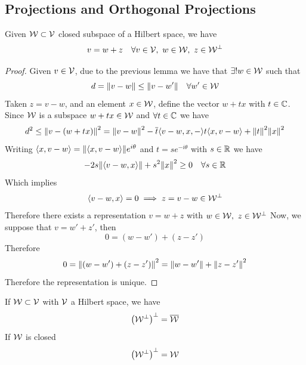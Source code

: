 \documentclass[../complete.tex]{subfiles}
\begin{document}
\subsection{Projections and Orthogonal Projections}
\begin{thm}[Projection]
	Given $\mathcal{W}\subset\mathcal{V}$ closed subspace of a Hilbert space, we have
	\begin{equation*}
		v=w+z\quad\forall v\in\V,\ w\in\W,\ z\in\W^\perp
	\end{equation*}
\end{thm}
\begin{proof}
	Given $v\in\mathcal{V}$, due to the previous lemma we have that $\exists!w\in\mathcal{W}$ such that
	\begin{equation*}
		d=\norm{v-w}\le\norm{v-w'}\quad\forall w'\in\mathcal{W}
	\end{equation*}
	Taken $z=v-w$, and an element $x\in\mathcal{W}$, define the vector $w+tx$ with $t\in\mathbb{C}$. Since $\mathcal{W}$ is a subspace $w+tx\in\mathcal{W}$ and $\forall t\in\mathbb{C}$ we have
	\begin{equation*}
		d^2\le\norm{v-(w+tx)}^2=\norm{v-w}^2-\overline{t}\langle v-w,x, - \rangle t\langle x, v-w \rangle+\norm{t}^2\norm{x}^2
	\end{equation*}
	Writing $\langle x, v-w \rangle=\norm{\langle x, v-w \rangle}e^{i\theta}$ and $t=se^{-i\theta}$ with $s\in\mathbb{R}$ we have
	\begin{equation*}
		-2s\norm{\langle v-w, x \rangle}+s^2\norm{x}^2\ge0\quad\forall s\in\mathbb{R}
	\end{equation*}
	Which implies
	\begin{equation*}
		\langle v-w, x \rangle=0\implies{} z=v-w\in\mathcal{W}^\perp
	\end{equation*}
	Therefore there exists a representation $v=w+z$ with $w\in\mathcal{W},\ z\in\mathcal{W}^\perp$
	Now, we suppose that $v=w'+z'$, then
	\begin{equation*}
		0=(w-w')+(z-z')
	\end{equation*}
	Therefore
	\begin{equation*}
		0=\norm{(w-w')+(z-z')}^2=\norm{w-w'}+\norm{z-z'}^2
	\end{equation*}
	Therefore the representation is unique.
\end{proof}
\begin{thm}
	If $\mathcal{W}\subset\mathcal{V}$ with $\mathcal{V}$ a Hilbert space, we have
	\begin{equation*}
		\left( \mathcal{W}^\perp \right)^\perp=\overline{\mathcal{W}}
	\end{equation*}
	If $\mathcal{W}$ is closed
	\begin{equation*}
		\left( \mathcal{W}^\perp \right)^\perp=\mathcal{W}
	\end{equation*}
\end{thm}
\end{document}
